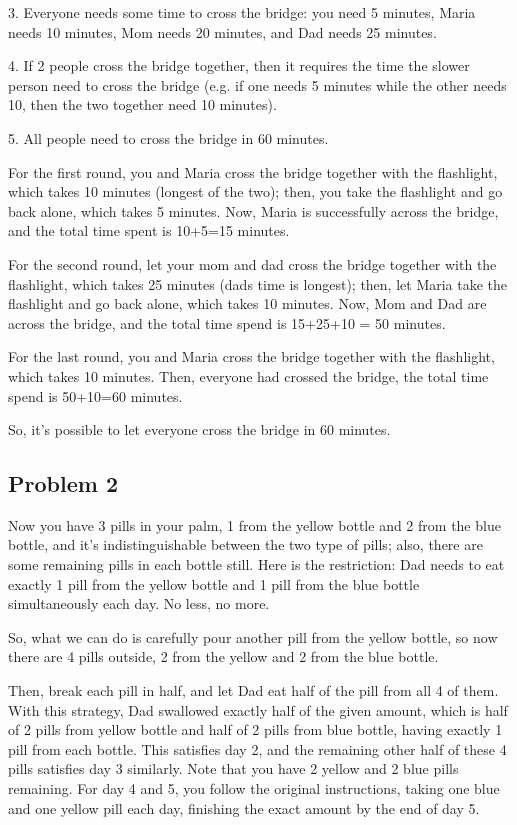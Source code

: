 \documentclass{article}
\begin{document}
3. Everyone needs some time to cross the bridge: you need 5 minutes, Maria needs 10 minutes, Mom needs 20 minutes, and Dad needs 25 minutes.

4. If 2 people cross the bridge together, then it requires the time the slower person need to cross the bridge 
(e.g. if one needs 5 minutes while the other needs 10, then the two together need 10 minutes).

5. All people need to cross the bridge in 60 minutes.

For the first round, you and Maria cross the bridge together with the flashlight, which takes 10 minutes (longest of the two); 
then, you take the flashlight and go back alone, which takes 5 minutes. 
Now, Maria is successfully across the bridge, and the total time spent is 10+5=15 minutes.

For the second round, let your mom and dad cross the bridge together with the flashlight, which takes 25 minutes (dads time is longest); 
then, let Maria take the flashlight and go back alone, which takes 10 minutes. Now, Mom and Dad are across the bridge, 
and the total time spend is 15+25+10 = 50 minutes.

For the last round, you and Maria cross the bridge together with the flashlight, which takes 10 minutes. Then, everyone had crossed the bridge, 
the total time spend is 50+10=60 minutes.

So, it's possible to let everyone cross the bridge in 60 minutes.


\hfill

\subsection{Problem 2}
Now you have 3 pills in your palm, 1 from the yellow bottle and 2 from the blue bottle, and it's indistinguishable between the two type of pills; 
also, there are some remaining pills in each bottle still.
Here is the restriction: Dad needs to eat exactly 1 pill from the yellow bottle and 1 pill from the blue bottle simultaneously each day. No less, no more. 

So, what we can do is carefully pour another pill from the yellow bottle, so now there are 4 pills outside, 2 from the yellow and 2 from the blue bottle.

Then, break each pill in half, and let Dad eat half of the pill from all 4 of them. With this strategy, Dad swallowed exactly half of the given amount, 
which is half of 2 pills from yellow bottle and half of 2 pills from blue bottle, having exactly 1 pill from each bottle. This satisfies day 2, 
and the remaining other half of these 4 pills satisfies day 3 similarly. Note that you have 2 yellow and 2 blue pills remaining.
For day 4 and 5, you follow the original instructions, taking one blue and one yellow pill each day, finishing the exact amount by the end of day 5.
\end{document}
